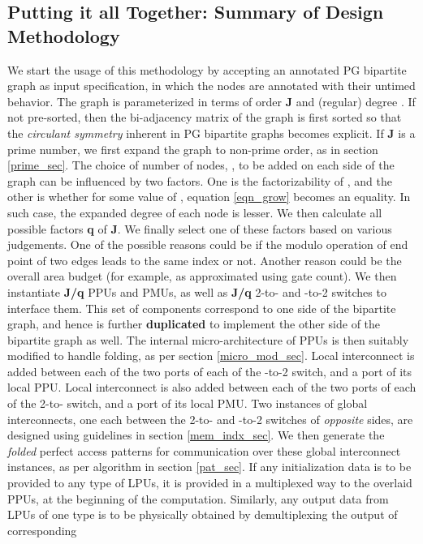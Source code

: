 \documentclass[12pt]{article}
\begin{document}
\subsection{Putting it all Together: Summary of Design Methodology}
We start the usage of this methodology by accepting an annotated
PG bipartite graph as input specification, in which the nodes are
annotated with their untimed behavior. The graph is
parameterized in terms of order \textbf{J} and (regular) degree . If
not pre-sorted, then the bi-adjacency matrix of the graph is first sorted
so that the \textit{circulant symmetry} inherent in PG bipartite graphs
becomes explicit. If \textbf{J} is a prime number, we first expand
the graph to non-prime order, as in section \ref{prime_sec}. The choice of
number of nodes, , to be added on each side of the graph can be
influenced by two factors. One is the factorizability of
, and the other is whether for some value of ,
equation \ref{eqn_grow} becomes an equality. In such case, the expanded
degree of each node is lesser. We then
calculate all possible factors \textbf{q} of
\textbf{J}. We finally select one of these factors based on various
judgements. One of the possible reasons could be if the modulo operation of
end point of two edges leads to the same index or not. Another reason could
be the overall area budget (for example, as approximated using gate count).
We then instantiate \textbf{J/q} PPUs and PMUs, as well as \textbf{J/q} 2-to- and -to-2
switches to interface them. This set of components correspond to
one side of the bipartite graph, and hence is further \textbf{duplicated}
to implement the other side of the bipartite graph as well. The
internal micro-architecture of PPUs is then suitably modified
to handle folding, as per section \ref{micro_mod_sec}. Local
interconnect is added between each of the two ports of each of the
-to-2 switch, and a port of its local PPU. Local
interconnect is also added between each of the two ports of each of the
2-to- switch, and a port of its local PMU. Two instances of global interconnects, one each
between the 2-to- and -to-2 switches of
\textit{opposite} sides, are designed using guidelines in section
\ref{mem_indx_sec}. We then generate the \textit{folded} perfect
access patterns for communication over these global interconnect instances,
as per algorithm in section \ref{pat_sec}. If any initialization data is
to be provided to any type of LPUs, it is provided in a
multiplexed way to the overlaid PPUs, at the beginning of the
computation. Similarly, any output data from LPUs of one type
is to be physically obtained by demultiplexing the output of corresponding
\end{document}
